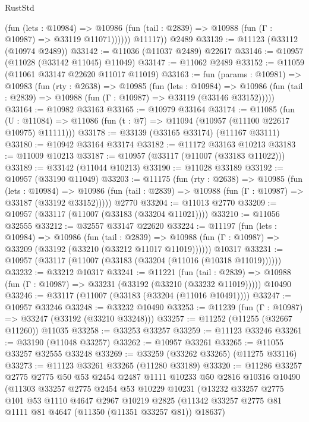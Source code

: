 \begin{lexlean}{RustStd}
\begin{coremodule}
              (fun (lets : @10984) =>
              @10986 (fun (tail : @2839) => @10988 (fun (Γ : @10987) => @33119 @11071))))))
        @11117))
    @2489
@33139 := @11123 (@33112 (@10974 @2489))
@33142 := @11036 (@11037 @2489) @22617
@33146 := @10957 (@11028 (@33142 @11045) @11049)
@33147 := @11062 @2489
@33152 := @11059 (@11061 @33147 @22620 @11017 @11019)
@33163 := fun (params : @10981) =>
  @10983
    (fun (rty : @2638) =>
    @10985
      (fun (lets : @10984) =>
      @10986 (fun (tail : @2839) => @10988 (fun (Γ : @10987) => @33119 (@33146 @33152)))))
@33164 := @10982 @33163
@33165 := @10979 @33164
@33174 := @11085
    (fun (U : @11084) => @11086 (fun (t : @7) => @11094 (@10957 (@11100 @22617 @10975) @11111)))
@33178 := @33139 (@33165 @33174) (@11167 @33111)
@33180 := @10942 @33164 @33174
@33182 := @11172 @33163 @10213
@33183 := @11009 @10213
@33187 := @10957 (@33117 (@11007 (@33183 @11022)))
@33189 := @33142 (@11044 @10213)
@33190 := @11028 @33189
@33192 := @10957 (@33190 @11049)
@33203 := @11175
    (fun (rty : @2638) =>
    @10985
      (fun (lets : @10984) =>
      @10986 (fun (tail : @2839) => @10988 (fun (Γ : @10987) => @33187 (@33192 @33152)))))
    @2770
@33204 := @11013 @2770
@33209 := @10957 (@33117 (@11007 (@33183 (@33204 @11021))))
@33210 := @11056 @32555
@33212 := @32557 @33147 @22620
@33224 := @11197
    (fun (lets : @10984) =>
    @10986
      (fun (tail : @2839) =>
      @10988 (fun (Γ : @10987) => @33209 (@33192 (@33210 (@33212 @11017 @11019))))))
    @10317
@33231 := @10957 (@33117 (@11007 (@33183 (@33204 (@11016 (@10318 @11019))))))
@33232 := @33212 @10317
@33241 := @11221
    (fun (tail : @2839) => @10988 (fun (Γ : @10987) => @33231 (@33192 (@33210 (@33232 @11019)))))
    @10490
@33246 := @33117 (@11007 (@33183 (@33204 (@11016 @10491))))
@33247 := @10957 @33246
@33248 := @33232 @10490
@33253 := @11239 (fun (Γ : @10987) => @33247 (@33192 (@33210 @33248)))
@33257 := @11252 (@11255 (@32667 @11260)) @11035
@33258 := @33253 @33257
@33259 := @11123 @33246
@33261 := @33190 (@11048 @33257)
@33262 := @10957 @33261
@33265 := @11055 @33257 @32555 @33248
@33269 := @33259 (@33262 @33265) (@11275 @33116)
@33273 := @11123 @33261 @33265 (@11280 @33189)
@33320 := @11286
    @33257
    @2775
    @2775
    @50
    @53
    @2454
    @2487
    @1111
    @10233
    @50
    @2816
    @10316
    @10490
    (@11303
      @33257
      @2775
      @2454
      @53
      @10229
      @10231
      (@13232
        @33257
        @2775
        @101
        @53
        @1110
        @4647
        @2967
        @10219
        @2825
        (@11342 @33257 @2775 @81 @1111 @81 @4647 (@11350 (@11351 @33257 @81)) @18637)

\end{coremodule}
\end{lexlean}
